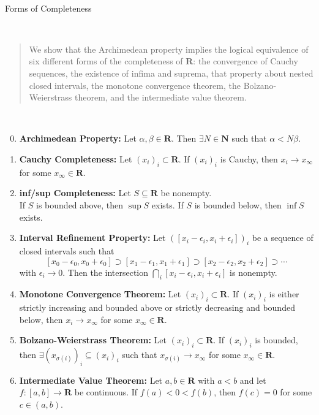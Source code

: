 \documentclass[oneside, 12pt]{memoir}
\theoremstyle{elegant}
\theoremstyle{elegant}
\def\RR{\mathbf R}
\def\NN{\mathbf N}
\begin{document}
\pagestyle{plain}
~\\[0em]
\begin{center}
\Large Forms of Completeness
\end{center}
~\\[-2em]
\begin{abstract}
We show that the Archimedean property implies the logical equivalence
of six different forms of the completeness of $\RR$: the convergence
of Cauchy sequences, the existence of infima and suprema, that property
about nested closed intervals, the monotone convergence theorem,
the Bolzano-Weierstrass theorem, and the intermediate value theorem.
\end{abstract}
~\\[-2em]
\begin{enumerate}
\setcounter{enumi}{-1}
\item \textbf{Archimedean Property:} Let $\alpha, \beta\in\RR$.
Then $\exists N\in\NN$ such that $\alpha < N\beta$.
\item \textbf{Cauchy Completeness:} Let $(x_i)_i\subset\RR$.
If $(x_i)_i$ is Cauchy, then $x_i\to x_\infty$ for some $x_\infty\in\RR$.
\item \textbf{inf/sup Completeness:} Let $S\subseteq\RR$ be nonempty.\\
If $S$ is bounded above, then $\sup S$ exists. If $S$ is bounded
below, then $\inf S$ exists.
\item \textbf{Interval Refinement Property:} Let
$([x_i - \epsilon_i, x_i + \epsilon_i])_i$
be a sequence of closed intervals such that
\[[x_0 - \epsilon_0, x_0 + \epsilon_0]\supset[x_1 - \epsilon_1, x_1 + \epsilon_1]\supset [x_2 - \epsilon_2, x_2 + \epsilon_2]\supset\cdots
\]
with $\epsilon_i\to 0$.
Then the intersection
$\bigcap_i[x_i - \epsilon_i, x_i + \epsilon_i]$ is nonempty.
\item \textbf{Monotone Convergence Theorem:} Let $(x_i)_i\subset\RR$.
If $(x_i)_i$ is either strictly increasing and bounded above
or strictly decreasing and bounded below, then $x_i\to x_\infty$ for some
$x_\infty\in\RR$.
\item \textbf{Bolzano-Weierstrass Theorem:}
Let $(x_i)_i\subset\RR$. If $(x_i)_i$ is bounded,
then $\exists (x_{\sigma(i)})_i\subseteq (x_i)_i$ such that
$x_{\sigma(i)}\to x_\infty$ for some $x_\infty\in\RR$.
\item \textbf{Intermediate Value Theorem:}
Let $a, b\in \RR$ with $a < b$ and let $f:[a, b]\to\RR$ be continuous.
If $f(a) < 0 < f(b)$, then $f(c) = 0$ for some $c\in (a, b)$.
\end{enumerate}
\end{document}
